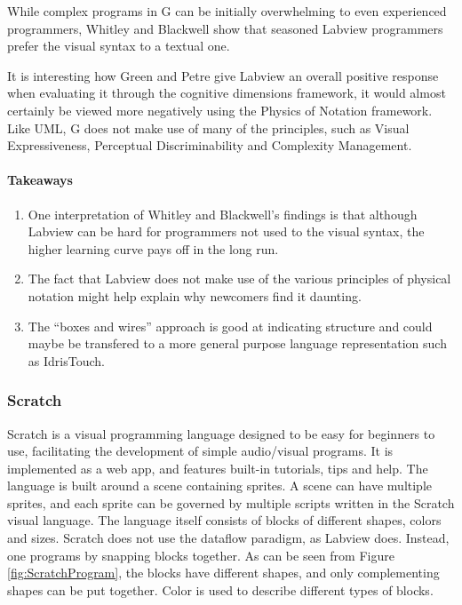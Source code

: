 While complex programs in G can be initially overwhelming to even experienced programmers, Whitley and Blackwell  show that seasoned Labview programmers prefer the visual syntax to a textual one.

It is interesting how Green and Petre  give Labview an overall positive response when evaluating it through the cognitive dimensions framework, it would almost certainly be viewed more negatively using the Physics of Notation framework. Like UML, G does not make use of many of the principles, such as Visual Expressiveness, Perceptual Discriminability and Complexity Management.

\paragraph{Takeaways}
\begin{enumerate}
	\item One interpretation of Whitley and Blackwell's findings  is that although Labview can be hard for programmers not used to the visual syntax, the higher learning curve pays off in the long run.
	\item The fact that Labview does not make use of the various principles of physical notation might help explain why newcomers find it daunting.
	\item The ``boxes and wires'' approach is good at indicating structure and could maybe be transfered to a more general purpose language representation such as IdrisTouch.
\end{enumerate}


\subsubsection{Scratch}
\label{subsub:Scratch}
Scratch is a visual programming language designed to be easy for beginners to use, facilitating the development of simple audio/visual programs. It is implemented as a web app, and features built-in tutorials, tips and help.
The language is built around a scene containing sprites. A scene can have multiple sprites, and each sprite can be governed by multiple scripts written in the Scratch visual language. The language itself consists of blocks of different shapes, colors and sizes. Scratch does not use the dataflow paradigm, as Labview does. Instead, one programs by snapping blocks together. As can be seen from Figure \ref{fig:ScratchProgram}, the blocks have different shapes, and only complementing shapes can be put together. Color is used to describe different types of blocks.

